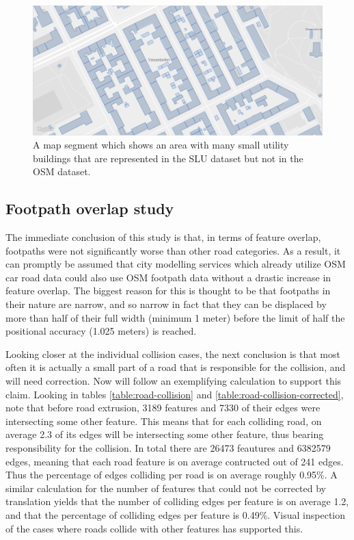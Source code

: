 \documentclass{kththesis}
\begin{document}
\begin{figure}[H]
    \centering
    \includegraphics[width=\textwidth,height=0.5\textheight,keepaspectratio]{img_map_utility_buildings}
    \caption{A map segment which shows an area with many small utility buildings that are represented in the SLU dataset but not in the OSM dataset.}
    \label{fig:osm-slu-map-utility-buildings}
\end{figure}


\subsection{Footpath overlap study}

The immediate conclusion of this study is that, in terms of feature overlap, footpaths were not significantly worse than other road categories.
As a result, it can promptly be assumed that city modelling services which already utilize OSM car road data could also use OSM footpath data without a drastic increase in feature overlap.
The biggest reason for this is thought to be that footpaths in their nature are narrow, and so narrow in fact that they can be displaced by more than half of their full width (minimum 1 meter) before the limit of half the positional accuracy (1.025 meters) is reached.

Looking closer at the individual collision cases, the next conclusion is that most often it is actually a small part of a road that is responsible for the collision, and will need correction.
Now will follow an exemplifying calculation to support this claim.
Looking in tables \ref{table:road-collision} and \ref{table:road-collision-corrected}, note that before road extrusion, 3189 features and 7330 of their edges were intersecting some other feature.
This means that for each colliding road, on average 2.3 of its edges will be intersecting some other feature, thus bearing responsibility for the collision.
In total there are 26473 feautures and 6382579 edges, meaning that each road feature is on average contructed out of 241 edges.
Thus the percentage of edges colliding per road is on average roughly 0.95\%.
A similar calculation for the number of features that could not be corrected by translation yields that the number of colliding edges per feature is on average 1.2, and that the percentage of colliding edges per feature is 0.49\%.
Visual inspection of the cases where roads collide with other features has supported this.
\end{document}
